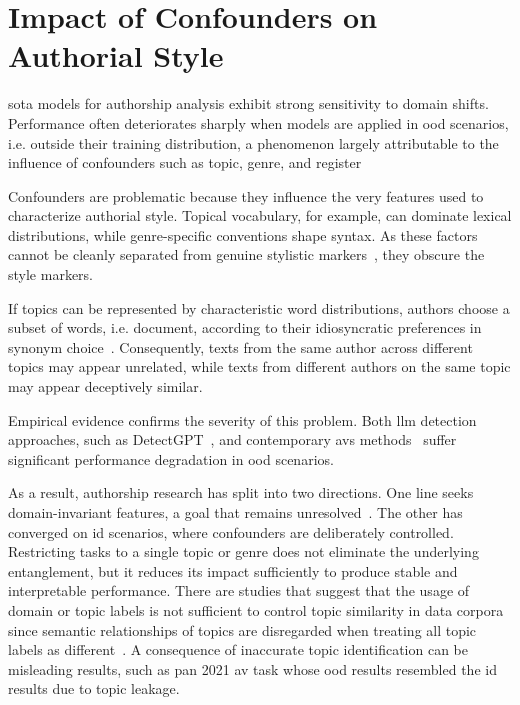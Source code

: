 \section{Impact of Confounders on Authorial Style}
\label{sec:contextual_factors}

\Acl{sota} models for authorship analysis exhibit strong sensitivity to domain shifts. 
Performance often deteriorates sharply when models are applied in \ac{ood} scenarios, i.e. outside their training distribution, a phenomenon largely attributable to the influence of confounders such as topic, genre, and register~\citep{Sundararajan_style_18,bischoff_importance_2020}

Confounders are problematic because they influence the very features used to characterize authorial style. 
Topical vocabulary, for example, can dominate lexical distributions, while genre-specific conventions shape syntax. 
As these factors cannot be cleanly separated from genuine stylistic markers~\citep{bischoff_importance_2020}, they obscure the style markers.

If topics can be represented by characteristic word distributions, authors choose a subset of words, i.e. document, according to their idiosyncratic preferences in synonym choice~\citep{altakrori_topic_2021}. 
Consequently, texts from the same author across different topics may appear unrelated, while texts from different authors on the same topic may appear deceptively similar.

Empirical evidence confirms the severity of this problem.
Both \ac{llm} detection approaches, such as DetectGPT~\citep{mitchell_detectgpt_2023,Wu_ODD_challenges_2025}, and contemporary \acp{av} methods~\citep{Thomas_cross_topic_24} suffer significant performance degradation in \ac{ood} scenarios.

As a result, authorship research has split into two directions. 
One line seeks domain-invariant features, a goal that remains unresolved~\citep{bischoff_importance_2020}. 
The other has converged on \ac{id} scenarios, where confounders are deliberately controlled. 
Restricting tasks to a single topic or genre does not eliminate the underlying entanglement, but it reduces its impact sufficiently to produce stable and interpretable performance.
There are studies that suggest that the usage of domain or topic labels is not sufficient to control topic similarity in data corpora since semantic relationships of topics are disregarded when treating all topic labels as different~\citep{sawatphol_cross_topic_av_24}.
A consequence of inaccurate topic identification can be misleading results, such as \ac{pan} 2021 \ac{av} task whose \ac{ood} results resembled the \ac{id} results due to topic leakage.


